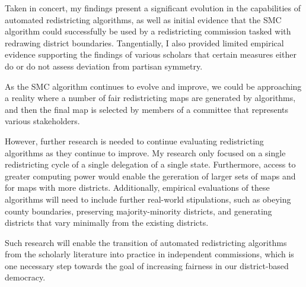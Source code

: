 Taken in concert, my findings present a significant evolution in the capabilities of automated redistricting algorithms, as well as initial evidence that the SMC algorithm could successfully be used by a redistricting commission tasked with redrawing district boundaries. Tangentially, I also provided limited empirical evidence supporting the findings of various scholars that certain measures either do or do not assess deviation from partisan symmetry.

As the SMC algorithm continues to evolve and improve, we could be approaching a reality where a number of fair redistricting maps are generated by algorithms, and then the final map is selected by members of a committee that represents various stakeholders.

However, further research is needed to continue evaluating redistricting algorithms as they continue to improve. My research only focused on a single redistricting cycle of a single delegation of a single state. Furthermore, access to greater computing power would enable the gereration of larger sets of maps and for maps with more districts. Additionally, empirical evaluations of these algorithms will need to include further real-world stipulations, such as obeying county boundaries, preserving majority-minority districts, and generating districts that vary minimally from the existing districts. 

Such research will enable the transition of automated redistricting algorithms from the scholarly literature into practice in independent commissions, which is one necessary step towards the goal of increasing fairness in our district-based democracy. 